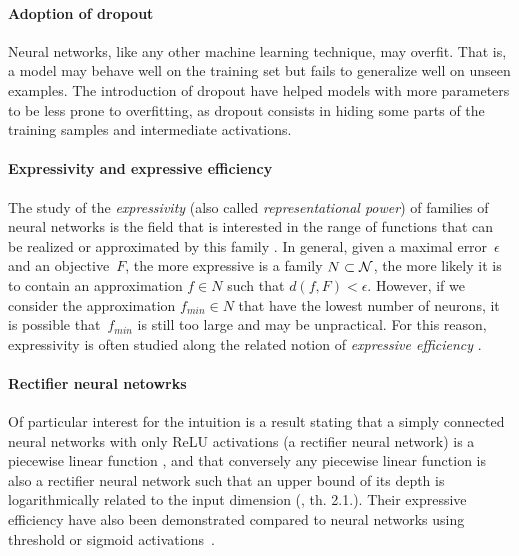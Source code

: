 \paragraph{Adoption of dropout}
Neural networks, like any other machine learning technique, may overfit. That is, a model may behave well on the training set but fails to generalize well on unseen examples. The introduction of dropout \citep{srivastava2014dropout} have helped models with more parameters to be less prone to overfitting, as dropout consists in hiding some parts of the training samples and intermediate activations.

\paragraph{Expressivity and expressive efficiency}
The study of the \emph{expressivity} (also called \emph{representational power}) of families of neural networks is the field that is interested in the range of functions that can be realized or approximated by this family \citep{haastad1991power,pascanu2013number}. In general, given a maximal error~$\epsilon$ and an objective~$F$, the more expressive is a family $N \subset \mathcal{N}$, the more likely it is to contain an approximation $f \in N$ such that $d(f,F) < \epsilon$. However, if we consider the approximation $f_{min} \in N$ that have the lowest number of neurons, it is possible that~$f_{min}$ is still too large and may be unpractical. For this reason, expressivity is often studied along the related notion of \emph{expressive efficiency} \citep{delalleau2011shallow,cohen2018boosting}.
\label{par:expr}

\paragraph{Rectifier neural netowrks}
Of particular interest for the intuition is a result stating that a simply connected neural networks with only ReLU activations (a rectifier neural network) is a piecewise linear function \citep{pascanu2013number,montufar2014number}, and that conversely any piecewise linear function is also a rectifier neural network such that an upper bound of its depth is logarithmically related to the input dimension (\cite{arora2018understanding}, th. 2.1.). Their expressive efficiency have also been demonstrated compared to neural networks using threshold or sigmoid activations~\citep{pan2016expressiveness}.

